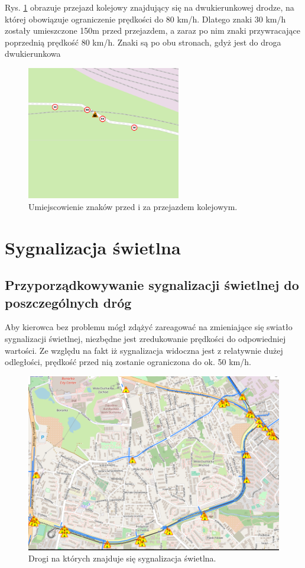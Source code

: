 Rys. \ref{sec:PrzejazdyKolejowe1} obrazuje przejazd kolejowy znajdujący się na dwukierunkowej drodze, na której obowiązuje ograniczenie prędkości do 80 km/h. Dlatego znaki 30 km/h zostały umieszczone 150m przed przejazdem, a zaraz po nim znaki przywracające poprzednią prędkość 80 km/h. Znaki są po obu stronach, gdyż jest do droga dwukierunkowa

\begin{figure}[h]
\caption{Umiejscowienie znaków przed i za przejazdem kolejowym.}
\label{sec:PrzejazdyKolejowe1}
\centering
\includegraphics[width=0.6\textwidth]{streetBeforeRail}
\end{figure}


\newpage
\section{Sygnalizacja świetlna}
\subsection{Przyporządkowywanie sygnalizacji świetlnej do poszczególnych dróg}

Aby kierowca bez problemu mógł zdążyć zareagować na zmieniające się swiatło sygnalizacji świetlnej, niezbędne jest zredukowanie prędkości do odpowiedniej wartości. Ze względu na fakt iż sygnalizacja widoczna jest z relatywnie dużej odległości, prędkość przed nią zostanie ograniczona do ok. 50 km/h.


\begin{figure}[h]
\caption{Drogi na których znajduje się sygnalizacja świetlna.}
\label{sec:PrzejazdyKolejowe2}
\centering
\includegraphics[width=1.1\textwidth]{traffic_sight}
\end{figure}

